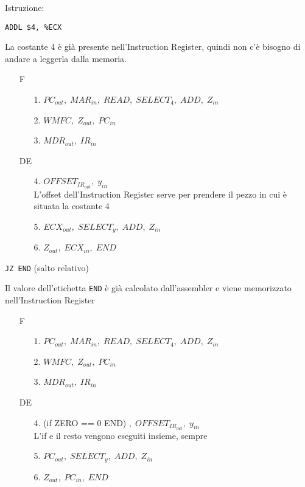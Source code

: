 \documentclass[a4paper]{article}
\theoremstyle{break}
\theoremstyle{break}
\theoremstyle{break}
\theoremstyle{break}
\begin{document}
\begin{example}
	Istruzione:
	\begin{center}
		\texttt{ADDL \$4, \%ECX}
	\end{center}

	\noindent La costante 4 è già presente nell'Instruction Register, quindi non c'è bisogno di
	andare a leggerla dalla memoria.
	\begin{enumerate}
		\item[F]
		      \begin{enumerate}
			      \item[1.] \( PC_{out},\; MAR_{in},\; READ ,\; SELECT_4,\; ADD,\; Z_{in}\)
			      \item[2.] \( WMFC,\; Z_{out},\; PC_{in}\)
			      \item[3.] \( MDR_{out},\; IR_{in} \)
		      \end{enumerate}
		\item[DE]
		      \begin{enumerate}
			      \item[4.] \( OFFSET_{IR_{out}},\; y_{in} \) \\
			            L'offset dell'Instruction Register serve per prendere il pezzo in cui è situata
			            la costante 4
			      \item[5.] \( ECX_{out},\; SELECT_{y},\;ADD,\; Z_{in} \)
			      \item[6.] \( Z_{out},\; ECX_{in},\; END \)
		      \end{enumerate}
	\end{enumerate}
\end{example}

\begin{example}
	\begin{center}
		\texttt{JZ END} \quad (salto relativo)
	\end{center}

	\noindent Il valore dell'etichetta \texttt{END} è già calcolato dall'assembler e viene memorizzato
	nell'Instruction Register
	\begin{enumerate}
		\item [F]
		      \begin{enumerate}
			      \item[1.] \( PC_{out},\; MAR_{in},\; READ ,\; SELECT_4,\; ADD,\; Z_{in}\)
			      \item[2.] \( WMFC,\; Z_{out},\; PC_{in}\)
			      \item[3.] \( MDR_{out},\; IR_{in} \)
		      \end{enumerate}
		\item[DE]
		      \begin{enumerate}
			      \item[4.] (if ZERO == 0 END) \(,\; OFFSET_{IR_{out}},\; y_{in} \)\\
			            L'if e il resto vengono eseguiti insieme, sempre
			      \item[5.] \( PC_{out},\; SELECT_{y},\; ADD,\; Z_{in} \)
			      \item[6.] \( Z_{out},\; PC_{in},\; END \)
		      \end{enumerate}
	\end{enumerate}
\end{example}
\end{document}
